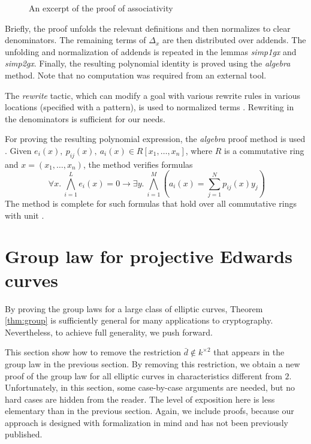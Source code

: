 \documentclass{llncs}
\begin{document}
\begin{figure}
	{}
	\caption{An excerpt of the proof of associativity}
	\label{fig:2}
\end{figure}

Briefly, the proof unfolds the relevant definitions and then
normalizes to clear denominators. The remaining terms of $\Delta_x$
are then distributed over addends. The unfolding and normalization of
addends is repeated in the lemmas \textit{simp1gx} and
\textit{simp2gx}. Finally, the resulting polynomial identity is proved
using the \textit{algebra} method.  Note that no computation was
required from an external tool.

The \emph{rewrite} tactic, which can modify a goal with various
rewrite rules in various locations (specified with a pattern), is
used to normalized terms \cite{noschinskipattern}.  Rewriting
in the denominators is sufficient for our needs.

For proving the resulting polynomial expression, the \textit{algebra}
proof method is used \cite{chaieb2007context}
\cite{chaieb2008automated} \cite{wenzel2019isabelle}.  Given
$e_i(x),\ p_{ij}(x),\ a_i(x) \in R[x_1,\ldots,x_n]$, where $R$ is a
commutative ring and $x=(x_1,\ldots,x_n)$, the method verifies
formulas
\[
\; \forall x.\ \bigwedge_{i = 1}^L
e_i({x}) = 0 \to \exists{y}.\ \bigwedge_{i = 1}^M
\left(a_i(x) = \sum_{j = 1}^N p_{ij}({x}) y_j \right)
\] 
The method is complete for such formulas that hold over all
commutative rings with unit \cite{harrison2007automating}.

\section{Group law for projective Edwards curves}\label{sec:proj}

By proving the group laws for a large class of elliptic curves,
Theorem \ref{thm:group} is sufficiently general for many applications
to cryptography.  Nevertheless, to achieve full generality, we
push forward.

This section show how to remove the restriction $\bar d\not\in
k^{\times 2}$ that appears in the group law in the previous section.
By removing this restriction, we obtain a new proof of the group law
for all elliptic curves in characteristics different from $2$.
Unfortunately, in this section, some case-by-case arguments are
needed, but no hard cases are hidden from the reader.  The level of
exposition here is less elementary than in the previous section.
Again, we include proofs, because our approach is designed with
formalization in mind and has not been previously published.
\end{document}
